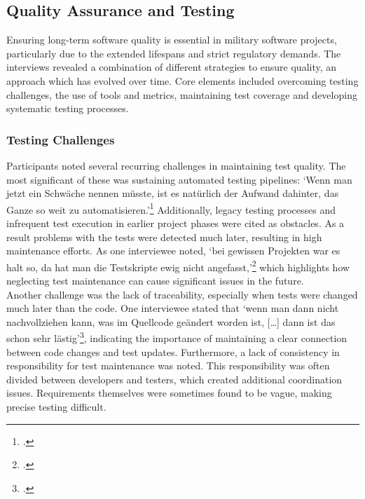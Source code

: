 \subsection{Quality Assurance and Testing}
Ensuring long-term software quality is essential in military software projects, particularly due to the extended lifespans and strict regulatory demands. The interviews revealed a combination of different strategies to ensure quality, an approach which has evolved over time.
Core elements included overcoming testing challenges, the use of tools and metrics, maintaining test coverage and developing systematic testing processes.

\subsubsection{Testing Challenges}
Participants noted several recurring challenges in maintaining test quality. The most significant of these was sustaining automated testing pipelines: `Wenn man jetzt ein Schwäche nennen müsste, ist es natürlich der Aufwand dahinter, das Ganze so weit zu automatisieren.'\footcite{interview3}
Additionally, legacy testing processes and infrequent test execution in earlier project phases were cited as obstacles. As a result problems with the tests were detected much later, resulting in high maintenance efforts. 
As one interviewee noted, `bei gewissen Projekten war es halt so, da hat man die Testskripte ewig nicht angefasst,'\footcite{interview1} which highlights how neglecting test maintenance can cause significant issues in the future.\\
Another challenge was the lack of traceability, especially when tests were changed much later than the code. One interviewee stated that `wenn man dann nicht nachvollziehen kann, was im Quellcode geändert worden ist, [\ldots] dann ist das schon sehr lästig'\footcite{interview1}, indicating
the importance of maintaining a clear connection between code changes and test updates. Furthermore, a lack of consistency in responsibility for test maintenance was noted.
This responsibility was often divided between developers and testers, which created additional coordination issues.
Requirements themselves were sometimes found to be vague, making precise testing difficult.\\

